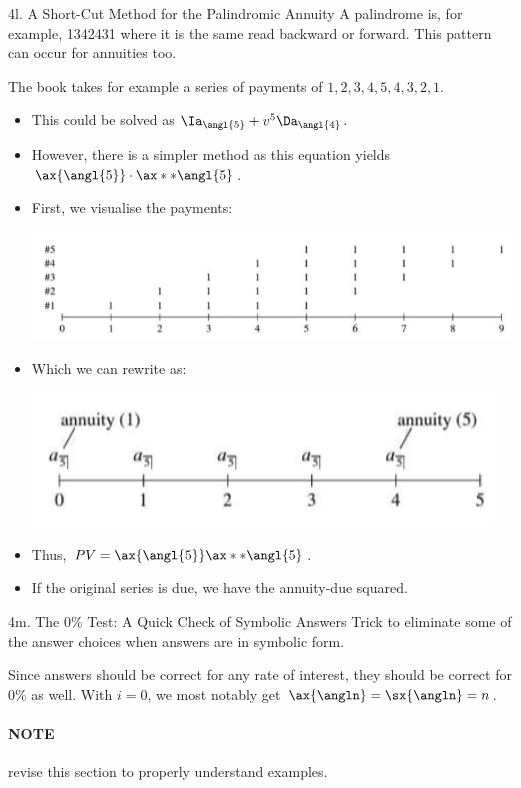 \begin{CHPT_SUMM_AUTO}[label = {L.-4l}]{4l. A Short-Cut Method for the Palindromic Annuity}
A palindrome is, for example, 1342431 where it is the same read backward or forward. This pattern can occur for annuities too.

The book takes for example a series of payments of $1, 2, 3, 4, 5, 4, 3, 2, 1$. 
	\begin{itemize}[leftmargin = *]
		\item	This could be solved as $\Ia_{\angl{5}} + v^{5} \Da_{\angl{4}}$.
		\item	However, there is a simpler method as this equation yields $\ax{\angl{5}} \cdot \ax**{\angl{5}}$.
		\item	First, we visualise the payments:
			\begin{center}
			\includegraphics[scale=.4]{img/palyndrome-graph.png}
			\end{center}
		\item	Which we can rewrite as:
			\begin{center}
			\includegraphics[scale=.4]{img/palyndrome-pmt.png}
			\end{center}
		\item	Thus, $PV = \ax{\angl{5}}\ax**{\angl{5}}$.
		\item	If the original series is due, we have the annuity-due squared.
	\end{itemize}
\end{CHPT_SUMM_AUTO}

\begin{CHPT_SUMM_AUTO}[label = {L.-4m}]{4m. The 0\% Test: A Quick Check of Symbolic Answers}
Trick to eliminate some of the answer choices when answers are in symbolic form.

Since answers should be correct for any rate of interest, they should be correct for $0\%$ as well. With $i = 0$, we most notably get $\ax{\angln} = \sx{\angln} = n$.
\paragraph*{NOTE}	revise this section to properly understand examples.
\end{CHPT_SUMM_AUTO}


